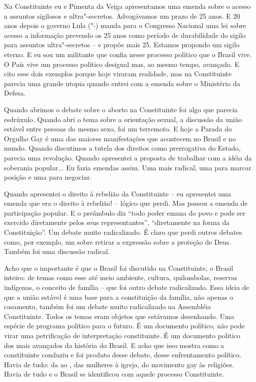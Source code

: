 Na Constituinte eu e Pimenta da Veiga apresentamos uma emenda sobre o
acesso a assuntos sigilosos e ultra"-secretos. Advogávamos um prazo de 25
anos. E 20 anos depois o governo Lula ("-) manda para o Congresso
Nacional uma lei sobre acesso a informação prevendo os 25 anos como
período de durabilidade do sigilo para assuntos ultra"-secretos -- e
propõe mais 25. Estamos propondo um sigilo eterno. E eu sou um militante
que confia nesse processo político que o Brasil vive. O País vive um
processo político desigual mas, ao mesmo tempo, avançado. E cito esse
dois exemplos porque hoje viraram realidade, mas na Constituinte parecia
uma grande utopia quando entrei com a emenda sobre o Ministério da
Defesa.

Quando abrimos o debate sobre o aborto na Constituinte foi algo que
parecia esdrúxulo. Quando abri o tema sobre a orientação sexual, a
discussão da união estável entre pessoas do mesmo sexo, foi um
terremoto. E hoje a Parada do Orgulho Gay é uma das maiores
manifestações que acontecem no Brasil e no mundo. Quando discutimos a
tutela dos direitos como prerrogativa do Estado, parecia uma revolução.
Quando apresentei a proposta de trabalhar com a idéia da soberania
popular... Eu fazia emendas assim. Uma mais radical, uma para marcar
posição e uma para negociar.

Quando apresentei o direito à rebelião da Constituinte -- eu apresentei
uma emenda que era o direito à rebelião! -- lógico que perdi. Mas passou
a emenda de participação popular. E o preâmbulo diz ``todo poder emana
do povo e pode ser exercido diretamente pelos seus representantes'',
``diretamente na forma da Constituição''. Um debate muito radicalizado.
É claro que perdi outros debates como, por exemplo, um sobre retirar a
expressão sobre a proteção de Deus. Também foi uma discussão radical.

Acho que o importante é que o Brasil foi discutido na Constituinte, o
Brasil inteiro: de temas como esse até meio ambiente, cultura,
quilombolas, reservas indígenas, o conceito de família -- que foi outro
debate radicalizado. Essa ideia de que a união estável é uma base para a
constituição da família, não apenas o casamento, também foi um debate
muito radicalizado na Assembléia Constituinte. Todos os temas eram
objetos que estávamos desenhando. Uma espécie de programa político para
o futuro. É um documento político, não pode virar uma petrificação de
interpretação constituinte. É um documento politico dos mais avançados
da história do Brasil. E acho que isso mostra como a constituinte
conduziu e foi produto desse debate, desse enfrentamento político. Havia
de tudo: da  ao , das mulheres à igreja, do movimento gay às
religiões. Havia de tudo e o Brasil se identificou com aquele processo
Constituinte.

